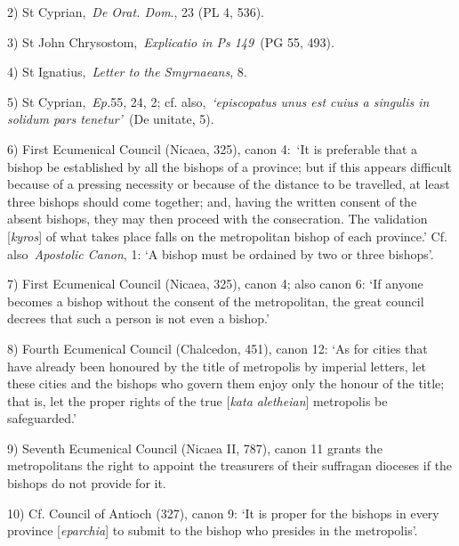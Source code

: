 2) St Cyprian,~\emph{De Orat. Dom}., 23 (PL 4, 536).

3) St John Chrysostom,~\emph{Explicatio in Ps 149~}(PG 55, 493).

4) St Ignatius,~\emph{Letter to the Smyrnaeans}, 8.

5) St Cyprian,~\emph{Ep.}55, 24, 2; cf. also,~\emph{`episcopatus unus
est cuius a singulis in solidum pars tenetur'~}(De unitate, 5).

6) First Ecumenical Council (Nicaea, 325), canon 4:~`It is preferable
that a bishop be established by all the bishops of a province; but if
this appears difficult because of a pressing necessity or because of the
distance to be travelled, at least three bishops should come together;
and, having the written consent of the absent bishops, they may then
proceed with the consecration. The validation {[}\emph{kyros}{]} of what
takes place falls on the metropolitan bishop of each province.' Cf.
also~\emph{Apostolic Canon}, 1: `A bishop must be ordained by two or
three bishops'.

7) First Ecumenical Council (Nicaea, 325), canon 4; also canon 6: `If
anyone becomes a bishop without the consent of the metropolitan, the
great council decrees that such a person is not even a bishop.'

8) Fourth Ecumenical Council (Chalcedon, 451), canon 12: `As for cities
that have already been honoured by the title of metropolis by imperial
letters, let these cities and the bishops who govern them enjoy only the
honour of the title; that is, let the proper rights of the true
{[}\emph{kata aletheian}{]} metropolis be safeguarded.'

9) Seventh Ecumenical Council (Nicaea II, 787), canon 11 grants the
metropolitans the right to appoint the treasurers of their suffragan
dioceses if the bishops do not provide for it.

10) Cf. Council of Antioch (327), canon 9: `It is proper for the bishops
in every province {[}\emph{eparchia}{]} to submit to the bishop who
presides in the metropolis'.

